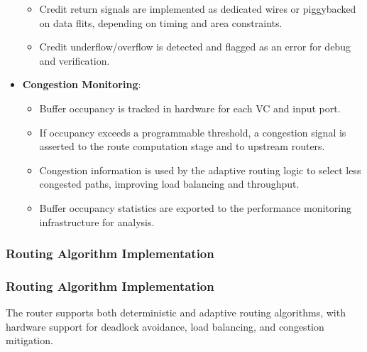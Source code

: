 \documentclass[11pt,a4paper]{article}
\begin{document}
\begin{itemize}
\begin{itemize}
        \item Credit return signals are implemented as dedicated wires or piggybacked on data flits, depending on timing and area constraints.
        \item Credit underflow/overflow is detected and flagged as an error for debug and verification.
    \end{itemize}
    \item \textbf{Congestion Monitoring}:
    \begin{itemize}
        \item Buffer occupancy is tracked in hardware for each VC and input port.
        \item If occupancy exceeds a programmable threshold, a congestion signal is asserted to the route computation stage and to upstream routers.
        \item Congestion information is used by the adaptive routing logic to select less congested paths, improving load balancing and throughput.
        \item Buffer occupancy statistics are exported to the performance monitoring infrastructure for analysis.
    \end{itemize}
\end{itemize}

\subsubsection{Routing Algorithm Implementation}

\subsubsection{Routing Algorithm Implementation}

The router supports both deterministic and adaptive routing algorithms, with hardware support for deadlock avoidance, load balancing, and congestion mitigation.
\end{document}

